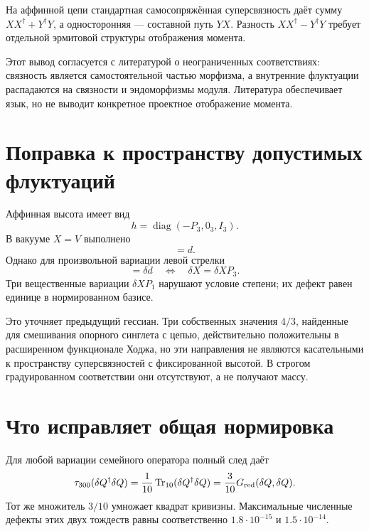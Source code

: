 \begin{theorem}
На аффинной цепи стандартная самосопряжённая суперсвязность даёт сумму
$XX^\dagger+Y^\dagger Y$, а односторонняя --- составной путь $YX$.
Разность $XX^\dagger-Y^\dagger Y$ требует отдельной эрмитовой структуры
отображения момента.
\end{theorem}

Этот вывод согласуется с литературой о неограниченных соответствиях:
связность является самостоятельной частью морфизма, а внутренние флуктуации
распадаются на связности и эндоморфизмы модуля. Литература обеспечивает
язык, но не выводит конкретное проектное отображение момента.

\section{Поправка к пространству допустимых флуктуаций}

Аффинная высота имеет вид
\begin{equation}
 h=\operatorname{diag}(-P_3,0_3,I_3).
\end{equation}
В вакууме $X=V$ выполнено
\begin{equation}
 [h,d]=d.
\end{equation}
Однако для произвольной вариации левой стрелки
\begin{equation}
 [h,\delta d]=\delta d
 \quad\Longleftrightarrow\quad
 \delta X=\delta XP_3.
 \label{eq:v5-fixed-height-tangent}
\end{equation}
Три вещественные вариации $\delta XP_1$ нарушают условие степени; их дефект
равен единице в нормированном базисе.

Это уточняет предыдущий гессиан. Три собственных значения $4/3$, найденные
для смешивания опорного синглета с цепью, действительно положительны в
расширенном функционале Ходжа, но эти направления не являются касательными
к пространству суперсвязностей с фиксированной высотой. В строгом
градуированном соответствии они отсутствуют, а не получают массу.

\section{Что исправляет общая нормировка}

Для любой вариации семейного оператора полный след даёт
\begin{equation}
 \tau_{300}(\delta Q^\dagger\delta Q)
 =\frac1{10}\operatorname{Tr}_{10}(\delta Q^\dagger\delta Q)
 =\frac3{10}G_{\mathrm{red}}(\delta Q,\delta Q).
\end{equation}
Тот же множитель $3/10$ умножает квадрат кривизны. Максимальные численные
дефекты этих двух тождеств равны соответственно
$1.8\cdot10^{-15}$ и $1.5\cdot10^{-14}$.

